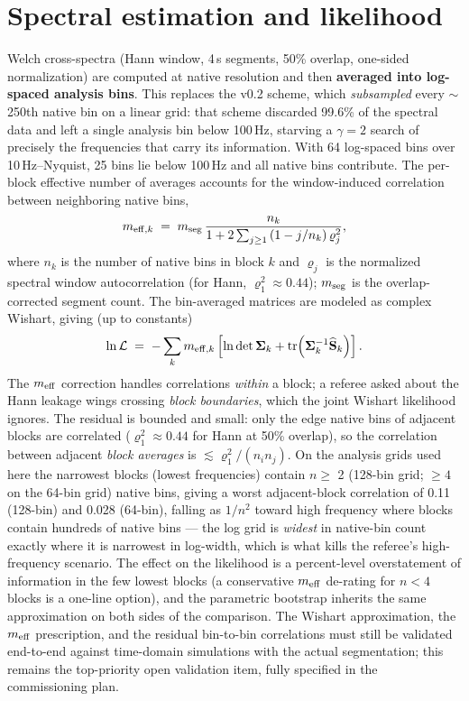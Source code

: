 \documentclass[11pt]{article}
\begin{document}
\section{Spectral estimation and likelihood}
\label{sec:likelihood}

Welch cross-spectra (Hann window, 4\,s segments, 50\% overlap, one-sided normalization) are computed at native resolution and then \textbf{averaged into log-spaced analysis bins}. This replaces the v0.2 scheme, which \emph{subsampled} every $\sim$250th native bin on a linear grid: that scheme discarded 99.6\% of the spectral data and left a single analysis bin below 100\,Hz, starving a $\gamma=2$ search of precisely the frequencies that carry its information. With 64 log-spaced bins over 10\,Hz--Nyquist, 25 bins lie below 100\,Hz and all native bins contribute. The per-block effective number of averages accounts for the window-induced correlation between neighboring native bins,
\begin{equation}
m_{{\rm eff},k} \;=\; m_{\rm seg}\, \frac{n_k}{1 + 2\sum_{j\ge1}\left(1 - j/n_k\right)\varrho_j^2},
\end{equation}
where $n_k$ is the number of native bins in block $k$ and $\varrho_j$ is the normalized spectral window autocorrelation (for Hann, $\varrho_1^2 \approx 0.44$); $m_{\rm seg}$ is the overlap-corrected segment count. The bin-averaged matrices are modeled as complex Wishart, giving (up to constants)
\begin{equation}
\ln \mathcal{L} \;=\; -\sum_k m_{{\rm eff},k} \left[ \ln\det \bm{\Sigma}_k + \mathrm{tr}\!\left( \bm{\Sigma}_k^{-1} \widehat{\mathbf{S}}_k \right) \right].
\label{eq:lnL}
\end{equation}
The $m_{\rm eff}$ correction handles correlations \emph{within} a block; a referee asked about the Hann leakage wings crossing \emph{block boundaries}, which the joint Wishart likelihood ignores. The residual is bounded and small: only the edge native bins of adjacent blocks are correlated ($\varrho_1^2 \approx 0.44$ for Hann at 50\% overlap), so the correlation between adjacent \emph{block averages} is $\lesssim \varrho_1^2/(n_i n_j)$. On the analysis grids used here the narrowest blocks (lowest frequencies) contain $n \ge$ 2 (128-bin grid; $\ge 4$ on the 64-bin grid) native bins, giving a worst adjacent-block correlation of 0.11 (128-bin) and 0.028 (64-bin), falling as $1/n^2$ toward high frequency where blocks contain hundreds of native bins --- the log grid is \emph{widest} in native-bin count exactly where it is narrowest in log-width, which is what kills the referee's high-frequency scenario. The effect on the likelihood is a percent-level overstatement of information in the few lowest blocks (a conservative $m_{\rm eff}$ de-rating for $n < 4$ blocks is a one-line option), and the parametric bootstrap inherits the same approximation on both sides of the comparison. The Wishart approximation, the $m_{\rm eff}$ prescription, and the residual bin-to-bin correlations must still be validated end-to-end against time-domain simulations with the actual segmentation; this remains the top-priority open validation item, fully specified in the commissioning plan.
\end{document}
